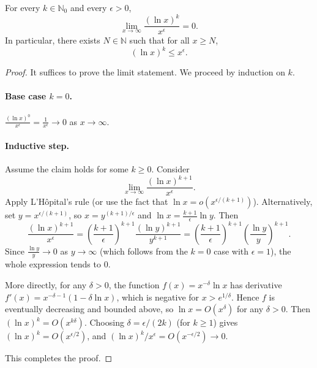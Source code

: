 \begin{lemma}
\label{lemma:logarithmic_growth_slower_than_any_positive_power}
For every $k \in \mathbb{N}_0$ and every $\epsilon > 0$,
$$\lim_{x \to \infty} \frac{(\ln x)^k}{x^\epsilon} = 0.$$
In particular, there exists $N \in \mathbb{N}$ such that for all $x \ge N$,
$$(\ln x)^k \le x^\epsilon.$$
\end{lemma}
\begin{proof}
It suffices to prove the limit statement. We proceed by induction on $k$.

\paragraph{Base case $k = 0$.} $\frac{(\ln x)^0}{x^\epsilon} = \frac{1}{x^\epsilon} \to 0$ as $x \to \infty$.

\paragraph{Inductive step.} Assume the claim holds for some $k \ge 0$. Consider
$$\lim_{x \to \infty} \frac{(\ln x)^{k+1}}{x^\epsilon}.$$
Apply L'Hôpital's rule (or use the fact that $\ln x = o(x^{\epsilon/(k+1)})$). Alternatively, set $y = x^{\epsilon/(k+1)}$, so $x = y^{(k+1)/\epsilon}$ and $\ln x = \frac{k+1}{\epsilon} \ln y$. Then
$$\frac{(\ln x)^{k+1}}{x^\epsilon} = \left( \frac{k+1}{\epsilon} \right)^{k+1} \frac{(\ln y)^{k+1}}{y^{k+1}} = \left( \frac{k+1}{\epsilon} \right)^{k+1} \left( \frac{\ln y}{y} \right)^{k+1}.$$
Since $\frac{\ln y}{y} \to 0$ as $y \to \infty$ (which follows from the $k=0$ case with $\epsilon=1$), the whole expression tends to $0$.

More directly, for any $\delta > 0$, the function $f(x) = x^{-\delta} \ln x$ has derivative $f'(x) = x^{-\delta-1}(1 - \delta \ln x)$, which is negative for $x > e^{1/\delta}$. Hence $f$ is eventually decreasing and bounded above, so $\ln x = O(x^\delta)$ for any $\delta > 0$. Then $(\ln x)^k = O(x^{k\delta})$. Choosing $\delta = \epsilon/(2k)$ (for $k \ge 1$) gives $(\ln x)^k = O(x^{\epsilon/2})$, and $(\ln x)^k / x^\epsilon = O(x^{-\epsilon/2}) \to 0$.

This completes the proof.
\end{proof}